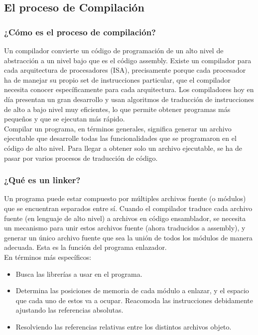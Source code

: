 \documentclass[twocolumn]{IEEEtran}
\begin{document}
\subsection{El proceso de Compilación}
\noindent
\subsubsection{¿Cómo es el proceso de compilación?}
\noindent
Un compilador convierte un código de programación de un alto nivel de abstracción a un  nivel bajo que es el código assembly. Existe un compilador para cada arquitectura de procesadores (ISA), precisamente porque cada procesador ha de manejar su propio set de instrucciones particular, que el compilador necesita conocer específicamente para cada arquitectura. Los compiladores hoy en día presentan un gran desarrollo y usan algoritmos de traducción de instrucciones de alto a bajo nivel muy eficientes, lo que permite obtener programas más pequeños y que se ejecutan más rápido.\\
Compilar un programa, en términos generales, significa generar un archivo ejecutable que desarrolle todas las funcionalidades que se programaron en el código de alto nivel. Para llegar a obtener solo un archivo ejecutable, se ha de pasar por varios procesos de traducción de código.

\subsubsection{¿Qué es un linker?}
\noindent
Un programa puede estar compuesto por múltiples archivos fuente (o módulos) que se encuentran separados entre sí. Cuando el compilador traduce cada archivo fuente (en lenguaje de alto nivel) a archivos en código ensamblador, se necesita un mecanismo para unir estos archivos fuente (ahora traducidos a assembly), y generar un único archivo fuente que sea la unión de todos los módulos de manera adecuada. Esta es la función del programa enlazador.\\
En términos más específicos:
\begin{itemize}
 \item Busca las librerías a usar en el programa.
 \item Determina las posiciones de memoria de cada módulo a enlazar, y el espacio que cada uno de estos va a ocupar. Reacomoda las instrucciones debidamente ajustando las referencias absolutas.
 \item Resolviendo las referencias relativas entre los distintos archivos objeto.
\end{itemize}
\end{document}
